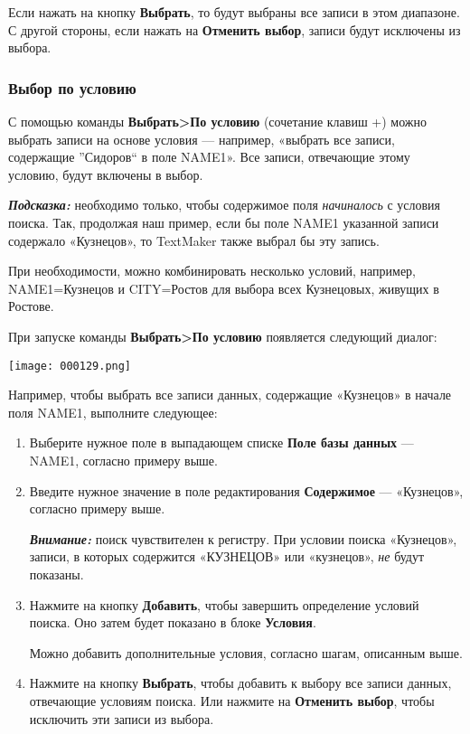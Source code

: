 ﻿\documentclass[a4paper,10pt]{article}
\begin{document}
Если нажать на кнопку \textbf{Выбрать}, то будут выбраны все записи в этом диапазоне. С другой стороны, если нажать на \textbf{Отменить выбор}, записи будут исключены из выбора.

\subsubsection{Выбор по условию}
С помощью команды \textbf{Выбрать>По условию} (сочетание клавиш +) можно выбрать записи на основе условия — например, «выбрать все записи, содержащие ''Сидоров`` в поле NAME1». Все записи, отвечающие этому условию, будут включены в выбор.

\begin{mdframed}[backgroundcolor=blue!10]
\textbf{\textit{Подсказка:}} необходимо только, чтобы содержимое поля \textit{начиналось} с условия поиска. Так, продолжая наш пример, если бы поле NAME1 указанной записи содержало «Кузнецов», то TextMaker также выбрал бы эту запись.
\end{mdframed}

При необходимости, можно комбинировать несколько условий, например, NAME1=Кузнецов и CITY=Ростов для выбора всех Кузнецовых, живущих в Ростове.

При запуске команды \textbf{Выбрать>По условию} появляется следующий диалог:

\texttt{[image: 000129.png]}

Например, чтобы выбрать все записи данных, содержащие «Кузнецов» в начале поля NAME1, выполните следующее:
\begin{enumerate}
 \item Выберите нужное поле в выпадающем списке \textbf{Поле базы данных} — NAME1, согласно примеру выше.
 \item Введите нужное значение в поле редактирования \textbf{Содержимое} — «Кузнецов», согласно примеру выше.
 
 \begin{mdframed}[backgroundcolor=blue!10]
\textbf{\textit{Внимание:}} поиск чувствителен к регистру. При условии поиска «Кузнецов», записи, в которых содержится «КУЗНЕЦОВ» или «кузнецов», \textit{не} будут показаны.
\end{mdframed}
\item Нажмите на кнопку \textbf{Добавить}, чтобы завершить определение условий поиска. Оно затем будет показано в блоке \textbf{Условия}.

Можно добавить дополнительные условия, согласно шагам, описанным выше.
\item Нажмите на кнопку \textbf{Выбрать}, чтобы добавить к выбору все записи данных, отвечающие условиям поиска. Или нажмите на \textbf{Отменить выбор}, чтобы исключить эти записи из выбора.
\end{enumerate}
\end{document}
